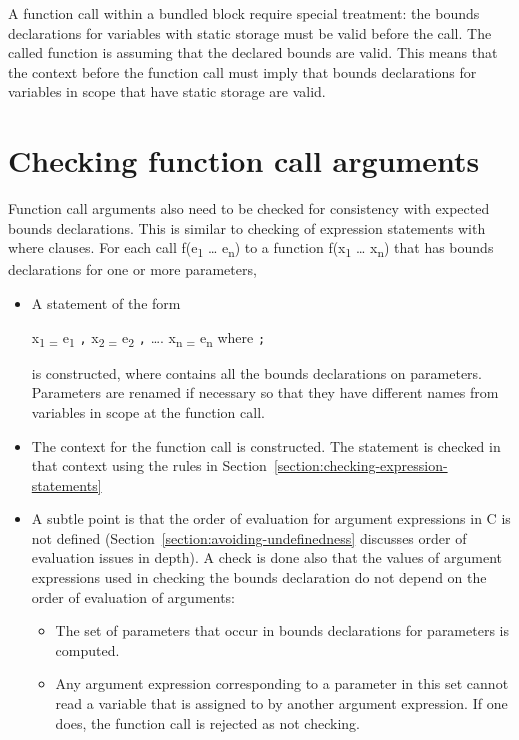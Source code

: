 A function call within a bundled block require special treatment: the
bounds declarations for variables with static storage must be valid
before the call. The called function is assuming that the declared
bounds are valid. This means that the context before the function call
must imply that bounds declarations for variables in scope that have
static storage are valid.

\section{Checking function call arguments}
\label{section:checking-function-call-arguments}

Function call arguments also need to be checked for consistency with
expected bounds declarations. This is similar to checking of expression
statements with where clauses. For each call f(e\textsubscript{1}
\ldots{} e\textsubscript{n}) to a function f(x\textsubscript{1} \ldots{}
x\textsubscript{n}) that has bounds declarations for one or more
parameters,

\begin{itemize}
\item
  A statement of the form

  x\textsubscript{1 =} e\textsubscript{1} \texttt{,} x\textsubscript{2
  =} e\textsubscript{2} \texttt{,} \ldots{}. x\textsubscript{n =}
  e\textsubscript{n} where  \texttt{;}

  is constructed, where  contains all the bounds
  declarations on parameters. Parameters are renamed if necessary so
  that they have different names from variables in scope at the function
  call.
\item
  The context for the function call is constructed. The statement is
  checked in that context using the rules in 
  Section~\ref{section:checking-expression-statements}
\item
  A subtle point is that the order of evaluation for argument
  expressions in C is not defined (Section~\ref{section:avoiding-undefinedness}
  discusses order of
  evaluation issues in depth). A check is done also that the values of
  argument expressions used in checking the bounds declaration do not
  depend on the order of evaluation of arguments:

  \begin{itemize}
  \item
    The set of parameters that occur in bounds declarations for
    parameters is computed.
  \item
    Any argument expression corresponding to a parameter in this set
    cannot read a variable that is assigned to by another argument
    expression. If one does, the function call is rejected as not
    checking.
  \end{itemize}
\end{itemize}

